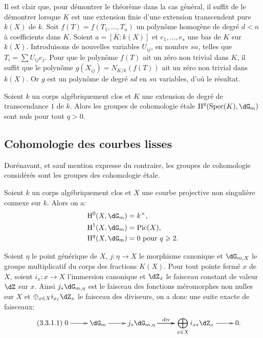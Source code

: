 Il est clair que, pour démontrer le théorème dans la cas général, il 
suffit de le démontrer lorsque $K$ est une extension finie d'une extension 
transcendent pure $k(X)$ de $k$. Soit $f(T)=f(T_1,\dotsc,T_n)$ un 
polynôme homogène de degré $d<n$ à coefficients dans $K$. Soient 
$a=[K:k(X)]$ et $e_1,\dotsc,e_s$ une bas de $K$ sur $k(X)$. Introduisons de 
nouvelles variables $U_{i j}$, en nombre $s n$, telles que 
$T_i=\sum U_{i j}e_j$. Pour que le polynôme $f(T)$ ait un zéro 
non trivial dans $K$, il suffit que le polynôme 
$g(X_{i j}) = N_{K/k}(f( T))$ ait un zéro non trivial dans $k(X)$. 
Or $g$ est un polynôme de degré $s d$ en $s n$ variables, d'où le 
résultat. 





\begin{corollary}\label{I:3-2-4}
  Soient $k$ un corps algébriquement clos et $K$ une extension de degré 
de transcendance $1$ de $k$. Alors les groupes de cohomologie étale 
$\h^q(\spec(K),\dG_m)$ sont nuls pour tout $q>0$. 
\end{corollary}










\subsection{Cohomologie des courbes lisses}

Dorénavant, et sauf mention expresse du contraire, les groupes de 
cohomologie considérés sont les groupes des cohomologie étale. 





\begin{proposition}\label{I:3-3-1}
Soient $k$ un corps algébriquement clos et $X$ une courbe projective non 
singulière connexe sur $k$. Alors on a:
\begin{align*}
  \h^0(X,\dG_m) &= k^\times \text{,} \\
  \h^1(X,\dG_m) &= \pic(X) \text{,} \\
  \h^q(X,\dG_m) &= 0 \text{ pour $q\geqslant 2$.}
\end{align*}
\end{proposition}

Soient $\eta$ le point générique de $X$, $j:\eta\to X$ le morphisme 
canonique et $\dG_{m,X}$ le groupe multiplicatif du corps des fractions 
$K(X)$. Pour tout pointe fermé $x$ de $X$, soient $i_x:x\to X$ l'immersion 
canonique et $\dZ_x$ le faisceau constant de valeur $\dZ$ sur $x$. Ainsi 
$j_*\dG_{m,\eta}$ est le faisceau des fonctions méromorphes non nulles sur 
$X$ et $\oplus_{x\in X} i_{x_I}\dZ_x$ le faisceau des diviseurs, on a donc une 
suite exacte de faisceaux:
\begin{equation*}\tag{3.3.1.1}\label{I:eq:3-3-1-1}
\xymatrix{
  0 \ar[r] 
    & \dG_m \ar[r]
    & j_* \dG_{m,\eta} \ar[r]^-{\dv} \ar[r] 
    & \displaystyle\bigoplus_{x\in X} i_{x*} \dZ_x \ar[r] 
    & 0\text{.}
}
\end{equation*}






